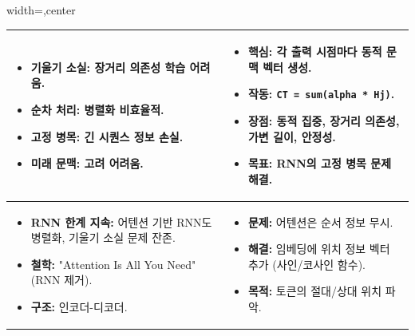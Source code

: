 \documentclass[11pt,a4paper]{article}
\theoremstyle{definition}
\begin{document}
\begin{adjustbox}{width=\textwidth,center}
\begin{tabular}{p{}p{}}
\toprule
\begin{tcolorbox}[mybox, title={RNN의 한계}]
\begin{itemize}
    \item \textbf{기울기 소실:} 장거리 의존성 학습 어려움.
    \item \textbf{순차 처리:} 병렬화 비효율적.
    \item \textbf{고정 병목:} 긴 시퀀스 정보 손실.
    \item \textbf{미래 문맥:} 고려 어려움.
\end{itemize}
\end{tcolorbox}
&
\begin{tcolorbox}[mybox, title={어텐션 메커니즘}]
\begin{itemize}
    \item \textbf{핵심:} 각 출력 시점마다 동적 문맥 벡터 생성.
    \item \textbf{작동:} \texttt{CT = sum(alpha * Hj)}.
    \item \textbf{장점:} 동적 집중, 장거리 의존성, 가변 길이, 안정성.
    \item \textbf{목표:} RNN의 고정 병목 문제 해결.
\end{itemize}
\end{tcolorbox} \\
\midrule
\begin{tcolorbox}[mybox, title={트랜스포머 등장 배경}]
\begin{itemize}
    \item \textbf{RNN 한계 지속:} 어텐션 기반 RNN도 병렬화, 기울기 소실 문제 잔존.
    \item \textbf{철학:} "Attention Is All You Need" (RNN 제거).
    \item \textbf{구조:} 인코더-디코더.
\end{itemize}
\end{tcolorbox}
&
\begin{tcolorbox}[mybox, title={위치 인코딩}]
\begin{itemize}
    \item \textbf{문제:} 어텐션은 순서 정보 무시.
    \item \textbf{해결:} 임베딩에 위치 정보 벡터 추가 (사인/코사인 함수).
    \item \textbf{목적:} 토큰의 절대/상대 위치 파악.
\end{itemize}
\end{tcolorbox} \\

\end{tabular}
\end{adjustbox}
\end{document}
